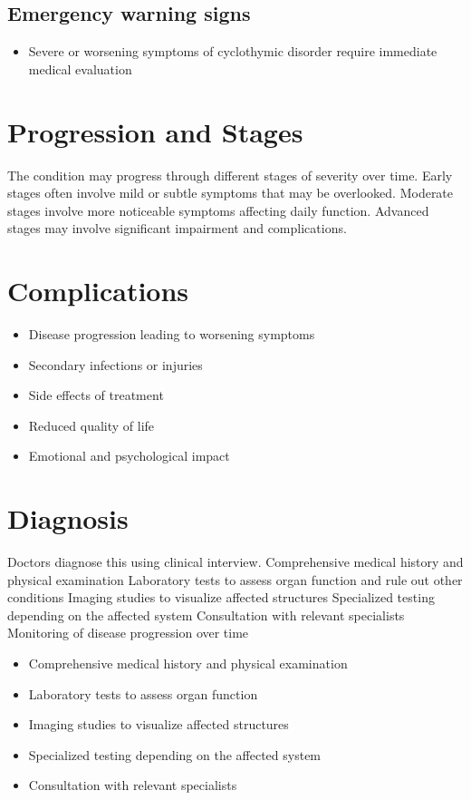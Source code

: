 \subsection{Emergency warning signs}
\begin{itemize}[noitemsep]
  \item Severe or worsening symptoms of cyclothymic disorder require immediate medical evaluation
\end{itemize}
\section{Progression and Stages}
The condition may progress through different stages of severity over time. Early stages often involve mild or subtle symptoms that may be overlooked. Moderate stages involve more noticeable symptoms affecting daily function. Advanced stages may involve significant impairment and complications.
\section{Complications}
\begin{itemize}[noitemsep]
  \item Disease progression leading to worsening symptoms
  \item Secondary infections or injuries
  \item Side effects of treatment
  \item Reduced quality of life
  \item Emotional and psychological impact
\end{itemize}
\section{Diagnosis}
Doctors diagnose this using clinical interview. Comprehensive medical history and physical examination Laboratory tests to assess organ function and rule out other conditions Imaging studies to visualize affected structures Specialized testing depending on the affected system Consultation with relevant specialists Monitoring of disease progression over time

\begin{itemize}[noitemsep]
  \item Comprehensive medical history and physical examination
  \item Laboratory tests to assess organ function
  \item Imaging studies to visualize affected structures
  \item Specialized testing depending on the affected system
  \item Consultation with relevant specialists
\end{itemize}
